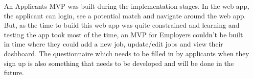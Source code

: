An Applicants MVP was built during the implementation stages. In the web app, the applicant can login, see a potential match and navigate around the web app. But, as the time to build this web app was quite constrained and learning and testing the app took most of the time, an MVP for Employers couldn't be built in time where they could add a new job, update/edit jobs and view their dashboard. The questionnaire which needs to be filled in by applicants when they sign up is also something that needs to be developed and will be done in the future. 